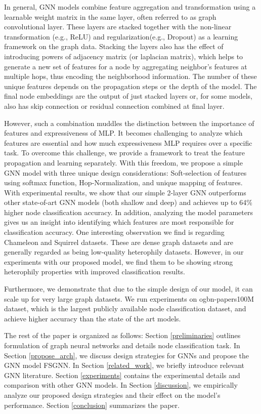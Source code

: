 \documentclass[sigconf,natbib=false]{acmart}
\begin{document}
In general, GNN models combine feature aggregation and transformation using a learnable weight matrix in the same layer, often referred to as graph convolutional layer.
These layers are stacked together with the non-linear transformation (e.g., ReLU) and regularization(e.g., Dropout) as a learning framework on the graph data. Stacking the layers also has the effect of introducing powers of adjacency matrix (or laplacian matrix), which helps to generate a new set of features for a node by aggregating neighbor's features at multiple hops, thus encoding the neighborhood information. The number of these unique features depends on the propagation steps or the depth of the model. The final node embeddings are the output of just stacked layers or, for some models, also has skip connection or residual connection combined at final layer.




However, such a combination muddles the distinction between the importance of features and expressiveness of MLP. It becomes challenging to analyze which features are essential and how much expressiveness MLP requires over a specific task. To overcome this challenge, we provide a framework to treat the feature propagation and learning separately. With this freedom, we propose a simple GNN model with three unique design considerations: Soft-selection of features using softmax function, Hop-Normalization, and unique mapping of features. With experimental results, we show that our simple 2-layer GNN outperforms other state-of-art GNN models (both shallow and deep) and achieves up to 64\% higher
node classification accuracy. In addition, analyzing the model parameters gives us an insight into identifying which features are most responsible
for classification accuracy. One interesting observation we find is regarding Chameleon and Squirrel datasets. These are dense graph datasets and are generally regarded as being low-quality heterophily datasets. However, in our experiments with our proposed model, we find them to be showing strong heterophily properties with improved classification results. 

Furthermore, we demonstrate that due to the simple design of our model, it can scale up for very large graph datasets. We run experiments on ogbn-papers100M dataset, which is the largest publicly available node classification dataset, and achieve higher accuracy than the state of the art models.

The rest of the paper is organized as follows: Section \ref{preliminaries} outlines formulation of graph neural networks and details node classification task. In Section \ref{propose_arch}, we discuss design strategies for GNNs and propose the GNN model FSGNN. In Section \ref{related_work}, we briefly introduce relevant GNN literature. Section \ref{experiments} contains the experimental details and comparison with other GNN models. In Section \ref{discussion}, we empirically analyze our proposed design strategies and their effect on the model's performance. Section \ref{conclusion} summarizes the paper.
\end{document}
